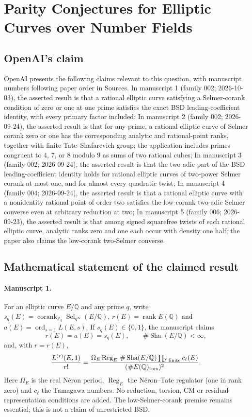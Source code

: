 \documentclass[11pt]{article}
\begin{document}
\section*{Parity Conjectures for Elliptic Curves over Number Fields}

\subsection{OpenAI's claim}
OpenAI presents the following claims relevant to this question, with manuscript numbers following paper order in Sources. In manuscript 1 (family 002; 2026-10-03), the asserted result is that a rational elliptic curve satisfying a Selmer-corank condition of zero or one at one prime satisfies the exact BSD leading-coefficient identity, with every primary factor included; In manuscript 2 (family 002; 2026-09-24), the asserted result is that for any prime, a rational elliptic curve of Selmer corank zero or one has the corresponding analytic and rational-point ranks, together with finite Tate--Shafarevich group; the application includes primes congruent to $4$, $7$, or $8$ modulo $9$ as sums of two rational cubes; In manuscript 3 (family 002; 2026-09-24), the asserted result is that the two-adic part of the BSD leading-coefficient identity holds for rational elliptic curves of two-power Selmer corank at most one, and for almost every quadratic twist; In manuscript 4 (family 004; 2026-09-24), the asserted result is that a rational elliptic curve with a nonidentity rational point of order two satisfies the low-corank two-adic Selmer converse even at arbitrary reduction at two; In manuscript 5 (family 006; 2026-09-23), the asserted result is that among signed squarefree twists of each rational elliptic curve, analytic ranks zero and one each occur with density one half; the paper also claims the low-corank two-Selmer converse.

\subsection{Mathematical statement of the claimed result}
\paragraph{Manuscript 1.}
For an elliptic curve $E/\mathbb Q$ and any prime $q$, write $s_q(E)=\operatorname{corank}_{\mathbb Z_q}\operatorname{Sel}_{q^{\infty}}(E/\mathbb Q)$, $r(E)=\operatorname{rank}E(\mathbb Q)$ and $a(E)=\operatorname{ord}_{s=1}L(E,s)$. If $s_q(E)\in\{0,1\}$, the manuscript claims
\[
 r(E)=a(E)=s_q(E),\qquad\#\operatorname{Sha}(E/\mathbb Q)<\infty,
\]
and, with $r=r(E)$,
\[
 \frac{L^{(r)}(E,1)}{r!}
 =\frac{\Omega_E\operatorname{Reg}_E\,\#\operatorname{Sha}(E/\mathbb Q)\prod_{\ell\text{ finite}}c_{\ell}(E)}
 {(\#E(\mathbb Q)_{\rm tors})^2}.
\]
Here $\Omega_E$ is the real N\'eron period, $\operatorname{Reg}_E$ the N\'eron--Tate regulator (one in rank zero) and $c_{\ell}$ the Tamagawa numbers. No reduction, torsion, CM or residual-representation conditions are added. The low-Selmer-corank premise remains essential; this is not a claim of unrestricted BSD.
\end{document}
